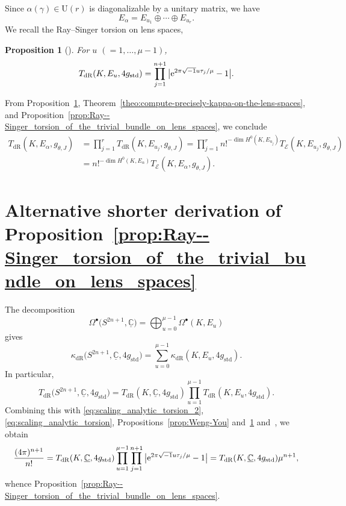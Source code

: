 \documentclass[10pt,a4paper]{amsart}
\numberwithin{equation}{section}
\newtheorem{Proposition}[Theorem]{Proposition}
 { \theoremstyle{definition}
\newtheorem{Definition}[Theorem]{Definition}
\newtheorem{Note}[Theorem]{Note}
\newtheorem{Example}[Theorem]{Example}
\newtheorem{Remark}[Theorem]{Remark} }
\newcommand{\ii}{\sqrt{-1}}
\newcommand{\deRham}{\mathrm{dR}}
\newcommand{\RN}{\cE}
\newcommand{\cE}{\mathcal{E}}
\begin{document}
Since $ \alpha (\gamma) \in \mathrm{U}(r)$
is diagonalizable by a unitary matrix,
we have
\[
 E_{\alpha}
 =
 E_{u_1}
 \oplus
 \cdots
 \oplus
 E_{u_r}
 .
\]
We recall the Ray--Singer torsion on lens spaces,
\begin{Proposition}[{\cite{Ray-70}}]
 \label{prop:Ray-70}
 For $u$ $(= 1 ,\ldots , \mu -1)$,
 \[
 T_{\deRham} ( K , E_{u}, 4 g_{\mathrm{std}} )
 =
 \prod_{j=1}^{n+1} \big| {\rm e}^{ 2 \pi \ii u {\tau}_j / \mu } -1 \big|
 .
 \]
\end{Proposition}
From Proposition~\ref{prop:Ray-70},
Theorem~\ref{theo:compute-precisely-kappa-on-the-lens-spaces},
and Proposition~\ref{prop:Ray--Singer_torsion_of_the_trivial_bundle_on_lens_spaces},
we conclude
\begin{align*}
 T_{\deRham} ( K , E_{\alpha}, g_{\theta , J} )
 & =
 \prod_{j=1}^r T_{\deRham} ( K , E_{u_j}, g_{\theta , J} )
 =
 \prod_{j=1}^r n!^{-\dim H^0 (K,E_{u_j})} T_{\RN} ( K , E_{u_j}, g_{\theta , J} )
 \\
 & =
 n!^{-\dim H^0 (K,E_{\alpha})} T_{\RN} ( K , E_{\alpha}, g_{\theta , J} )
 .
\end{align*}


\appendix

\section{Alternative shorter derivation of Proposition~\ref{prop:Ray--Singer_torsion_of_the_trivial_bundle_on_lens_spaces}}
The decomposition
\[
 \Omega^{\bullet} \big(S^{2n+1} , \underline{\mathbb{C}}\big)
 =
 \bigoplus_{u=0}^{\mu -1}
 \Omega^{\bullet} ( K , E_u )
\]
gives
\[
 \kappa_{\deRham} \big(S^{2n+1 } , \underline{\mathbb{C}} , 4 g_{\mathrm{std}}\big)
 =
 \sum_{u=0}^{\mu -1}
 \kappa_{\deRham} (K , E_u , 4 g_{\mathrm{std}})
 .
\]
In particular,
\[
 T_{\deRham} \big(S^{2n+1 } , \underline{\mathbb{C}} , 4 g_{\mathrm{std}}\big)
 =
 T_{\deRham} (K , \underline{\mathbb{C}} , 4 g_{\mathrm{std}})
 \prod_{u=1}^{\mu -1}
 T_{\deRham} (K , E_u , 4 g_{\mathrm{std}})
 .
\]
Combining this with \eqref{eq:scaling_analytic_torsion_2}, \eqref{eq:scaling_analytic_torsion}, Propositions~\ref{prop:Weng-You} and~\ref{prop:Ray-70} and~\cite{Melo-Spreafico-09}, we obtain
\[
 \frac{(4 \pi )^{n+1} }{ n!}
 =
 T_{\deRham} (K , \underline{\mathbb{C}} , 4 g_{\mathrm{std}})
 \prod_{u=1}^{\mu -1}
 \prod_{j=1}^{n+1}
 \big|
 {\rm e}^{2 \pi \sqrt{-1} u \tau_j / \mu } -1
 \big|
 =
 T_{\deRham} (K , \underline{\mathbb{C}} , 4 g_{\mathrm{std}})
 \mu^{n+1},
\]
whence Proposition~\ref{prop:Ray--Singer_torsion_of_the_trivial_bundle_on_lens_spaces}.
\end{document}
